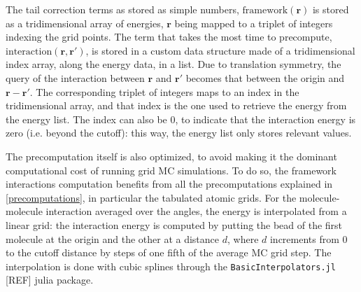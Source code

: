 \documentclass[main.tex]{subfiles}
\begin{document}
The tail correction terms as stored as simple numbers, $\text{framework}(\boldsymbol r)$ is stored as a tridimensional array of energies, $\boldsymbol r$ being mapped to a triplet of integers indexing the grid points. The term that takes the most time to precompute, $\text{interaction}(\boldsymbol r, \boldsymbol r')$, is stored in a custom data structure made of a tridimensional index array, along the energy data, in a list. Due to translation symmetry, the query of the interaction between $\boldsymbol r$ and $\boldsymbol r'$ becomes that between the origin and $\boldsymbol r - \boldsymbol r'$. The corresponding triplet of integers maps to an index in the tridimensional array, and that index is the one used to retrieve the energy from the energy list. The index can also be 0, to indicate that the interaction energy is zero (i.e. beyond the cutoff): this way, the energy list only stores relevant values.

The precomputation itself is also optimized, to avoid making it the dominant computational cost of running grid MC simulations. To do so, the framework interactions computation benefits from all the precomputations explained in \cref{precomputations}, in particular the tabulated atomic grids. For the molecule-molecule interaction averaged over the angles, the energy is interpolated from a linear grid: the interaction energy is computed by putting the bead of the first molecule at the origin and the other at a distance $d$, where $d$ increments from 0 to the cutoff distance by steps of one fifth of the average MC grid step. The interpolation is done with cubic splines through the \texttt{BasicInterpolators.jl} [REF] julia package.
\end{document}
